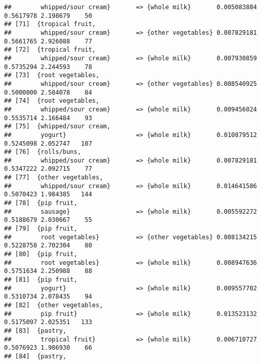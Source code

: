 \documentclass[]{article}
\begin{document}
\begin{verbatim}
##        whipped/sour cream}       => {whole milk}       0.005083884  0.5617978 2.198679    50
## [71]  {tropical fruit,                                                                      
##        whipped/sour cream}       => {other vegetables} 0.007829181  0.5661765 2.926088    77
## [72]  {tropical fruit,                                                                      
##        whipped/sour cream}       => {whole milk}       0.007930859  0.5735294 2.244593    78
## [73]  {root vegetables,                                                                     
##        whipped/sour cream}       => {other vegetables} 0.008540925  0.5000000 2.584078    84
## [74]  {root vegetables,                                                                     
##        whipped/sour cream}       => {whole milk}       0.009456024  0.5535714 2.166484    93
## [75]  {whipped/sour cream,                                                                  
##        yogurt}                   => {whole milk}       0.010879512  0.5245098 2.052747   107
## [76]  {rolls/buns,                                                                          
##        whipped/sour cream}       => {whole milk}       0.007829181  0.5347222 2.092715    77
## [77]  {other vegetables,                                                                    
##        whipped/sour cream}       => {whole milk}       0.014641586  0.5070423 1.984385   144
## [78]  {pip fruit,                                                                           
##        sausage}                  => {whole milk}       0.005592272  0.5188679 2.030667    55
## [79]  {pip fruit,                                                                           
##        root vegetables}          => {other vegetables} 0.008134215  0.5228758 2.702304    80
## [80]  {pip fruit,                                                                           
##        root vegetables}          => {whole milk}       0.008947636  0.5751634 2.250988    88
## [81]  {pip fruit,                                                                           
##        yogurt}                   => {whole milk}       0.009557702  0.5310734 2.078435    94
## [82]  {other vegetables,                                                                    
##        pip fruit}                => {whole milk}       0.013523132  0.5175097 2.025351   133
## [83]  {pastry,                                                                              
##        tropical fruit}           => {whole milk}       0.006710727  0.5076923 1.986930    66
## [84]  {pastry,                                                                              

\end{verbatim}
\end{document}
